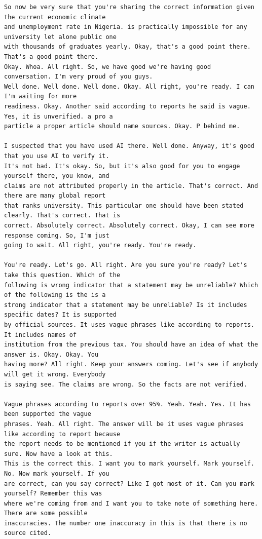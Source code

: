{\begin{Verbatim}
So now be very sure that you're sharing the correct information given the current economic climate
and unemployment rate in Nigeria. is practically impossible for any university let alone public one
with thousands of graduates yearly. Okay, that's a good point there. That's a good point there.
Okay. Whoa. All right. So, we have good we're having good conversation. I'm very proud of you guys.
Well done. Well done. Well done. Okay. All right, you're ready. I can I'm waiting for more
readiness. Okay. Another said according to reports he said is vague. Yes, it is unverified. a pro a
particle a proper article should name sources. Okay. P behind me.

I suspected that you have used AI there. Well done. Anyway, it's good that you use AI to verify it.
It's not bad. It's okay. So, but it's also good for you to engage yourself there, you know, and
claims are not attributed properly in the article. That's correct. And there are many global report
that ranks university. This particular one should have been stated clearly. That's correct. That is
correct. Absolutely correct. Absolutely correct. Okay, I can see more response coming. So, I'm just
going to wait. All right, you're ready. You're ready.

You're ready. Let's go. All right. Are you sure you're ready? Let's take this question. Which of the
following is wrong indicator that a statement may be unreliable? Which of the following is the is a
strong indicator that a statement may be unreliable? Is it includes specific dates? It is supported
by official sources. It uses vague phrases like according to reports. It includes names of
institution from the previous tax. You should have an idea of what the answer is. Okay. Okay. You
having more? All right. Keep your answers coming. Let's see if anybody will get it wrong. Everybody
is saying see. The claims are wrong. So the facts are not verified.

Vague phrases according to reports over 95%. Yeah. Yeah. Yes. It has been supported the vague
phrases. Yeah. All right. The answer will be it uses vague phrases like according to report because
the report needs to be mentioned if you if the writer is actually sure. Now have a look at this.
This is the correct this. I want you to mark yourself. Mark yourself. No. Now mark yourself. If you
are correct, can you say correct? Like I got most of it. Can you mark yourself? Remember this was
where we're coming from and I want you to take note of something here. There are some possible
inaccuracies. The number one inaccuracy in this is that there is no source cited.


\end{Verbatim}}
